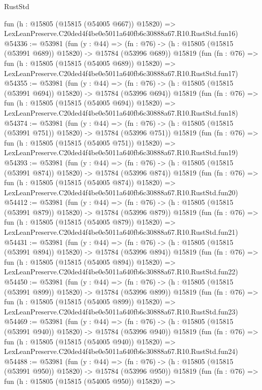 \begin{lexlean}{RustStd}
\begin{coremodule}
    fun (h : @15805 (@15815 (@54005 @667)) @15820) =>
    LexLeanPreserve.C20ded4f4be0e5011a640fb6c30888a67.R10.RustStd.fun16)
@54336 := @53981
    (fun (y : @44) =>
    (fn : @76) -> (h : @15805 (@15815 (@53991 @689)) @15820) -> @15784 (@53996 @689))
    @15819
    (fun (fn : @76) =>
    fun (h : @15805 (@15815 (@54005 @689)) @15820) =>
    LexLeanPreserve.C20ded4f4be0e5011a640fb6c30888a67.R10.RustStd.fun17)
@54355 := @53981
    (fun (y : @44) =>
    (fn : @76) -> (h : @15805 (@15815 (@53991 @694)) @15820) -> @15784 (@53996 @694))
    @15819
    (fun (fn : @76) =>
    fun (h : @15805 (@15815 (@54005 @694)) @15820) =>
    LexLeanPreserve.C20ded4f4be0e5011a640fb6c30888a67.R10.RustStd.fun18)
@54374 := @53981
    (fun (y : @44) =>
    (fn : @76) -> (h : @15805 (@15815 (@53991 @751)) @15820) -> @15784 (@53996 @751))
    @15819
    (fun (fn : @76) =>
    fun (h : @15805 (@15815 (@54005 @751)) @15820) =>
    LexLeanPreserve.C20ded4f4be0e5011a640fb6c30888a67.R10.RustStd.fun19)
@54393 := @53981
    (fun (y : @44) =>
    (fn : @76) -> (h : @15805 (@15815 (@53991 @874)) @15820) -> @15784 (@53996 @874))
    @15819
    (fun (fn : @76) =>
    fun (h : @15805 (@15815 (@54005 @874)) @15820) =>
    LexLeanPreserve.C20ded4f4be0e5011a640fb6c30888a67.R10.RustStd.fun20)
@54412 := @53981
    (fun (y : @44) =>
    (fn : @76) -> (h : @15805 (@15815 (@53991 @879)) @15820) -> @15784 (@53996 @879))
    @15819
    (fun (fn : @76) =>
    fun (h : @15805 (@15815 (@54005 @879)) @15820) =>
    LexLeanPreserve.C20ded4f4be0e5011a640fb6c30888a67.R10.RustStd.fun21)
@54431 := @53981
    (fun (y : @44) =>
    (fn : @76) -> (h : @15805 (@15815 (@53991 @894)) @15820) -> @15784 (@53996 @894))
    @15819
    (fun (fn : @76) =>
    fun (h : @15805 (@15815 (@54005 @894)) @15820) =>
    LexLeanPreserve.C20ded4f4be0e5011a640fb6c30888a67.R10.RustStd.fun22)
@54450 := @53981
    (fun (y : @44) =>
    (fn : @76) -> (h : @15805 (@15815 (@53991 @899)) @15820) -> @15784 (@53996 @899))
    @15819
    (fun (fn : @76) =>
    fun (h : @15805 (@15815 (@54005 @899)) @15820) =>
    LexLeanPreserve.C20ded4f4be0e5011a640fb6c30888a67.R10.RustStd.fun23)
@54469 := @53981
    (fun (y : @44) =>
    (fn : @76) -> (h : @15805 (@15815 (@53991 @940)) @15820) -> @15784 (@53996 @940))
    @15819
    (fun (fn : @76) =>
    fun (h : @15805 (@15815 (@54005 @940)) @15820) =>
    LexLeanPreserve.C20ded4f4be0e5011a640fb6c30888a67.R10.RustStd.fun24)
@54488 := @53981
    (fun (y : @44) =>
    (fn : @76) -> (h : @15805 (@15815 (@53991 @950)) @15820) -> @15784 (@53996 @950))
    @15819
    (fun (fn : @76) =>
    fun (h : @15805 (@15815 (@54005 @950)) @15820) =>

\end{coremodule}
\end{lexlean}
